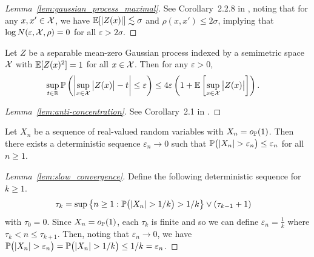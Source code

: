 \begin{proof}[Lemma~\ref{lem:gaussian_process_maximal}]

  See Corollary~2.2.8 in \citet{van1996weak},
  noting that for any $x,x' \in \cX$, we have
  $\E[|Z(x)|] \lesssim \sigma$ and
  $\rho(x,x') \leq 2\sigma$,
  implying that
  $\log N(\varepsilon, \cX, \rho) = 0$
  for all
  $\varepsilon > 2 \sigma$.
\end{proof}

\begin{lemma}
  \label{lem:anti-concentration}

  Let $Z$ be a separable mean-zero Gaussian process
  indexed by a semimetric space $\cX$ with
  $\E[Z(x)^2] = 1$
  for all $x \in \cX$.
  Then for any $\varepsilon > 0$,
  \begin{align*}
    \sup_{t \in \R}
    \P\left(
      \left|
      \sup_{x \in \cX}
      \big| Z(x) \big|
      - t
      \right|
      \leq \varepsilon
    \right)
    &\leq
    4 \varepsilon
    \left(
      1 + \E\left[
        \sup_{x \in \cX}
        \big| Z(x) \big|
      \right]
    \right).
  \end{align*}

\end{lemma}

\begin{proof}[Lemma~\ref{lem:anti-concentration}]

  See Corollary~2.1
  in \citet{chernozhukov2014anti}.
\end{proof}

\begin{lemma}
  \label{lem:slow_convergence}

  Let $X_n$ be a sequence of real-valued random
  variables with
  $X_n = o_\P(1)$.
  Then there exists a deterministic sequence
  $\varepsilon_n \to 0$
  such that
  $\P\big(|X_n| > \varepsilon_n\big) \leq \varepsilon_n$
  for all $n \geq 1$.

\end{lemma}

\begin{proof}[Lemma~\ref{lem:slow_convergence}]

  Define the following deterministic sequence
  for $k \geq 1$.
  \begin{align*}
    \tau_k
    &=
    \sup
    \big\{
    n \geq 1:
    \P\big(|X_n| > 1/k\big)
    > 1/k
    \big\}
    \vee
    (\tau_{k-1} +1)
  \end{align*}
  with $\tau_0 = 0$.
  Since $X_n = o_\P(1)$,
  each $\tau_k$ is finite
  and so we can define
  $\varepsilon_n = \frac{1}{k}$
  where $\tau_k < n \leq \tau_{k+1}$.
  Then, noting that $\varepsilon_n \to 0$,
  we have
  $\P\big(|X_n| > \varepsilon_n\big)
  = \P\big(|X_n| > 1/k\big) \leq 1/k = \varepsilon_n$.
\end{proof}

